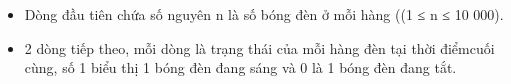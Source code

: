 \begin{itemize}
	\item     Dòng đầu tiên chứa số nguyên n là số bóng đèn ở mỗi hàng ((1 ≤ n ≤ 10 000).   
	\item     2 dòng tiếp theo, mỗi dòng là trạng thái của mỗi hàng đèn tại thời điểmcuối cùng, số 1 biểu thị 1 bóng đèn đang sáng và 0 là 1 bóng đèn đang tắt.   
\end{itemize}